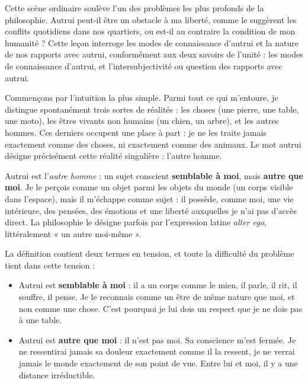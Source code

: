 \documentclass[11pt]{article}
\newcommand{\cle}[1]{{\popxbold\color{popdark}#1}}
\newcounter{popsec}
\newcounter{popsub}
\newcommand{\courssub}[1]{%
  \stepcounter{popsub}%
  \par\vspace{9pt}\noindent{\popxbold\fontsize{11.5}{13}\selectfont\color{popink}{\color{poporange}\thepopsec.\thepopsub}\hspace{6pt}#1}\par\nopagebreak\vspace{4pt}
}
\begin{document}
Cette scène ordinaire soulève l'un des problèmes les plus profonds de la philosophie. Autrui peut-il être un obstacle à ma liberté, comme le suggèrent les conflits quotidiens dans nos quartiers, ou est-il au contraire la condition de mon humanité ? Cette leçon interroge les \cle{modes de connaissance d'autrui} et la nature de nos \cle{rapports avec autrui}, conformément aux deux savoirs de l'unité : les modes de connaissance d'autrui, et l'intersubjectivité ou question des rapports avec autrui.

\courssub{Définition d'autrui : un autre moi-même}

Commençons par l'intuition la plus simple. Parmi tout ce qui m'entoure, je distingue spontanément trois sortes de réalités : les choses (une pierre, une table, une moto), les êtres vivants non humains (un chien, un arbre), et les autres hommes. Ces derniers occupent une place à part : je ne les traite jamais exactement comme des choses, ni exactement comme des animaux. Le mot \cle{autrui} désigne précisément cette réalité singulière : l'autre homme.

\begin{definition}[Autrui]
\cle{Autrui} est l'\emph{autre homme} : un sujet conscient \textbf{semblable à moi}, mais \textbf{autre que moi}. Je le perçois comme un objet parmi les objets du monde (un corps visible dans l'espace), mais il m'échappe comme sujet : il possède, comme moi, une vie intérieure, des pensées, des émotions et une liberté auxquelles je n'ai pas d'accès direct. La philosophie le désigne parfois par l'expression latine \emph{alter ego}, littéralement « un autre moi-même ».
\end{definition}

La définition contient deux termes en tension, et toute la difficulté du problème tient dans cette tension :

\begin{itemize}
\item Autrui est \textbf{semblable à moi} : il a un corps comme le mien, il parle, il rit, il souffre, il pense. Je le reconnais comme un être de même nature que moi, et non comme une chose. C'est pourquoi je lui dois un respect que je ne dois pas à une table.
\item Autrui est \textbf{autre que moi} : il n'est pas moi. Sa conscience m'est fermée. Je ne ressentirai jamais sa douleur exactement comme il la ressent, je ne verrai jamais le monde exactement de son point de vue. Entre lui et moi, il y a une distance irréductible.
\end{itemize}
\end{document}
